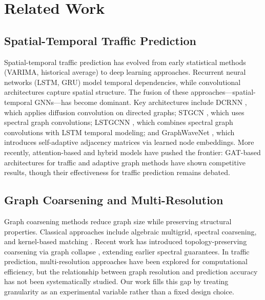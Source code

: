 \documentclass[letterpaper]{article}
\begin{document}
\section{Related Work}

\subsection{Spatial-Temporal Traffic Prediction}

Spatial-temporal traffic prediction has evolved from early statistical methods (VARIMA, historical average) to deep learning approaches. Recurrent neural networks (LSTM, GRU) model temporal dependencies, while convolutional architectures capture spatial structure. The fusion of these approaches---spatial-temporal GNNs---has become dominant. Key architectures include DCRNN \cite{li2018diffusion}, which applies diffusion convolution on directed graphs; STGCN \cite{yu2018spatio}, which uses spectral graph convolutions; LSTGCNN \cite{kipf2017semi}, which combines spectral graph convolutions with LSTM temporal modeling; and GraphWaveNet \cite{wu2019graph}, which introduces self-adaptive adjacency matrices via learned node embeddings. More recently, attention-based and hybrid models have pushed the frontier: GAT-based architectures for traffic \cite{liang2025spatial,he2026gamma} and adaptive graph methods \cite{jiang2024adaptive} have shown competitive results, though their effectiveness for traffic prediction remains debated.

\subsection{Graph Coarsening and Multi-Resolution}

Graph coarsening methods reduce graph size while preserving structural properties. Classical approaches include algebraic multigrid, spectral coarsening, and kernel-based matching \cite{loukas2019graph}. Recent work has introduced topology-preserving coarsening via graph collapse \cite{wu2026graph}, extending earlier spectral guarantees. In traffic prediction, multi-resolution approaches have been explored for computational efficiency, but the relationship between graph resolution and prediction accuracy has not been systematically studied. Our work fills this gap by treating granularity as an experimental variable rather than a fixed design choice.
\end{document}
